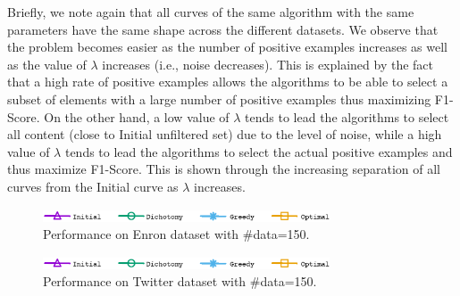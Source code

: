 Briefly, we note again that all curves of the same algorithm with the same parameters have the same shape across the different datasets. We observe that the problem becomes easier as the number of positive examples increases as well as the value of $\lambda$ increases (i.e., noise decreases). 
This is explained by the fact that a high rate of positive examples allows the algorithms to be able to select a subset of elements with a large number of positive examples thus maximizing F1-Score. On the other hand, a low value of $\lambda$ tends to lead the algorithms to select all content (close to Initial unfiltered set) due to the level of noise, while a high value of $\lambda$ tends to lead the algorithms to select the actual positive examples and thus maximize F1-Score. This is shown through the increasing separation of all curves from the Initial curve as $\lambda$ increases.



\begin{figure}[H]
\begin{centering}
\includegraphics[width=8.5cm]{imgs/legend1}
\par\end{centering}
\begin{centering}
\par\end{centering}
\caption{Performance on Enron dataset with \#data=150.}
\label{fig:F1_vs_Pos_Enron}
\end{figure}

\begin{figure}[H]
\begin{centering}
\includegraphics[width=8.5cm]{imgs/legend1}
\par\end{centering}
\begin{centering}
\par\end{centering}
\caption{Performance on Twitter dataset with \#data=150.}
\label{fig:F1_vs_Pos_Twitter}
\end{figure}

